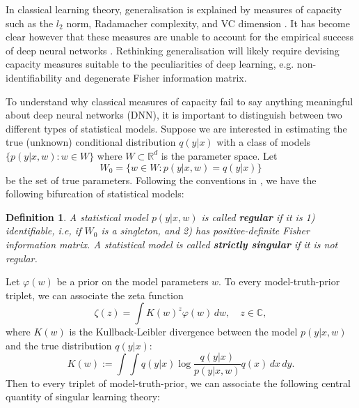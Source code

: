 \documentclass{article} %
\newtheorem{definition}{Definition}
\begin{document}
In classical learning theory, generalisation is explained by measures of capacity such as the $l_2$ norm, Radamacher complexity, and VC dimension \citep{bousquet2003introduction}. It has become clear however that these measures are unable to account for the empirical success of deep neural networks \citep{zhang_understanding_2017}. Rethinking generalisation will likely require devising capacity measures suitable to the peculiarities of deep learning, e.g. non-identifiability and degenerate Fisher information matrix. 

To understand why classical measures of capacity fail to say anything meaningful about deep neural networks (DNN), it is important to distinguish between two different types of statistical models. Suppose we are interested in estimating the true (unknown) conditional distribution $q(y|x)$ with a class of models $\{p(y|x,w): w \in W\}$ where $W \subset \mathbb R^d$ is the parameter space. Let 
$$
W_0 = \{w \in W: p(y|x,w)=q(y|x)\}
$$
 be the set of true parameters. 
Following the conventions in \cite{watanabe_algebraic_2009}, we have the following bifurcation of statistical models:
\begin{definition}
A statistical model $p(y|x,w)$ is called \textbf{regular} if it is 1) identifiable, i.e, if $W_0$ is a singleton, and 2) has positive-definite Fisher information matrix. A statistical model is called \textbf{strictly singular} if it is not regular. 
\end{definition}


Let  $\varphi(w)$ be a prior on the model parameters $w$.
To every model-truth-prior triplet, we can associate the zeta function
\begin{equation}
\zeta(z) = \int K(w)^z \varphi(w) \,dw, \quad z \in \mathbb C,
\end{equation} 
where $K(w)$ is the Kullback-Leibler divergence between the model $p(y|x,w)$ and the true distribution $q(y|x)$:
\begin{equation}
    K(w) := \int \!\int q(y|x) \log \frac{ q(y|x) }{ p(y|x,w) } q(x) \,dx \,dy.
\end{equation}
Then to every triplet of model-truth-prior, we can associate the following central quantity of singular learning theory:
\end{document}
